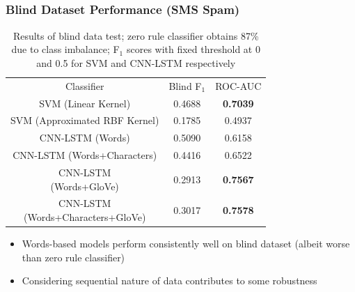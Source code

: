 \documentclass{beamer}
\begin{document}
\subsection{}
\begin{framefont}{\footnotesize}
	\begin{frame}
		\frametitle{Blind Dataset Performance (SMS Spam)}
		\begin{table}
			\centering
			\captionsetup{justification=centering}
			\bgroup
			\def\arraystretch{1.5}
			\begin{tabular}{|c|c|c|} \hline
				Classifier & Blind F$_1$ & ROC-AUC\\ \hhline{|=|=|=|}
				SVM (Linear Kernel) & 0.4688 & \textbf{0.7039} \\ \hline
				SVM (Approximated RBF Kernel) & 0.1785 & 0.4937 \\ \hline
				CNN-LSTM (Words) & 0.5090 & 0.6158 \\ \hline
				CNN-LSTM (Words+Characters) & 0.4416 & 0.6522 \\ \hline
				\makecell{CNN-LSTM \\(Words+GloVe)} & 0.2913 & \textbf{0.7567} \\ \hline
				\makecell{CNN-LSTM \\(Words+Characters+GloVe)} & 0.3017 & \textbf{0.7578} \\ \hline
			\end{tabular}
			\egroup
			\caption{Results of blind data test; zero rule classifier obtains 87\% due to class imbalance; F$_1$ scores with fixed threshold at 0 and 0.5 for SVM and CNN-LSTM respectively}
		\end{table}
		\vspace{-10pt}
		\begin{itemize}
			\item Words-based models perform consistently well on blind dataset (albeit worse than zero rule classifier)
			\item Considering sequential nature of data contributes to some robustness
		\end{itemize}
	\end{frame}
\end{framefont}
\end{document}
